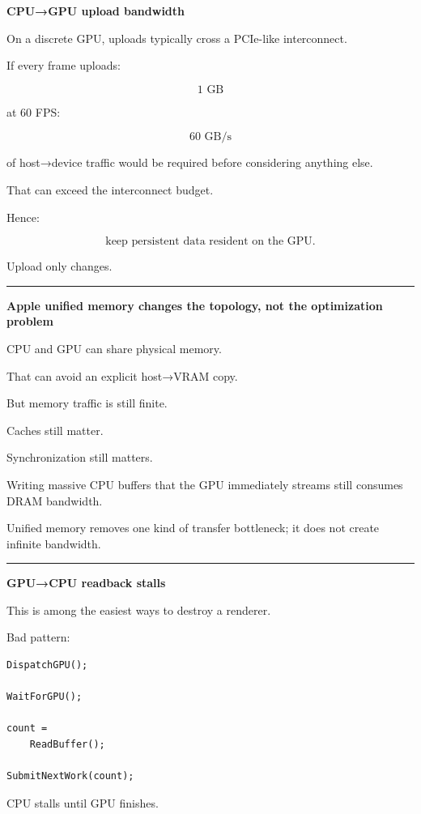 \textbf{CPU→GPU upload bandwidth}

On a discrete GPU, uploads typically cross a PCIe-like interconnect.

If every frame uploads:

\[
1\text{ GB}
\]

at 60 FPS:

\[
60\text{ GB/s}
\]

of host→device traffic would be required before considering anything else.

That can exceed the interconnect budget.

Hence:

\[
\boxed{
\text{keep persistent data resident on the GPU}.
}
\]

Upload only changes.

\begin{center}\rule{0.5\linewidth}{0.5pt}\end{center}

\textbf{Apple unified memory changes the topology, not the optimization problem}

CPU and GPU can share physical memory.

That can avoid an explicit host→VRAM copy.

But memory traffic is still finite.

Caches still matter.

Synchronization still matters.

Writing massive CPU buffers that the GPU immediately streams still consumes DRAM bandwidth.

Unified memory removes one kind of transfer bottleneck; it does not create infinite bandwidth.

\begin{center}\rule{0.5\linewidth}{0.5pt}\end{center}

\textbf{GPU→CPU readback stalls}

This is among the easiest ways to destroy a renderer.

Bad pattern:

\protect{}\label{p10-bad-read}%
\begin{verbatim}
DispatchGPU();

WaitForGPU();

count =
    ReadBuffer();

SubmitNextWork(count);
\end{verbatim}

CPU stalls until GPU finishes.

